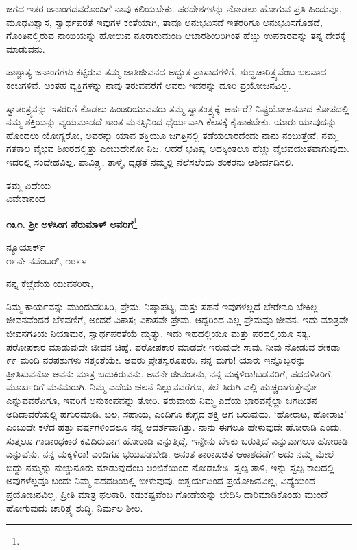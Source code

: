 ಜಗದ ಇತರ ಜನಾಂಗದವರೊಂದಿಗೆ ನಾವು ಕಲಿಯಬೇಕು. ಪರದೇಶಗಳನ್ನು ನೋಡಲು ಹೋಗುವ ಪ್ರತಿ ಹಿಂದುವೂ, ಮೂಢವಿಶ್ವಾಸ, ಸ್ವಾರ್ಥಪರತೆ ಇವುಗಳ ಕಂತೆಯಾಗಿ, ತಾವೂ ಅನುಭವಿಸದೆ ಇತರರಿಗೂ ಅನುಭವಿಸಗೊಡದೆ, ಗೊಂತಿನಲ್ಲಿರುವ ನಾಯಿಯನ್ನು ಹೋಲುವ ನೂರಾರುಮಂದಿ ಆಚಾರಶೀಲರಿಗಿಂತ ಹೆಚ್ಚು ಉಪಕಾರವನ್ನು ತನ್ನ ದೇಶಕ್ಕೆ ಮಾಡುವನು.
\vspace{0.2cm}

ಪಾಶ್ಚಾತ್ಯ ಜನಾಂಗಗಳು ಕಟ್ಟಿರುವ ತಮ್ಮ ಜಾತಿಜೀವನದ ಅದ್ಭುತ ಪ್ರಾಸಾದಗಳಿಗೆ, ಶುದ್ಧಚಾರಿತ್ರ್ಯವೆಂಬ ಬಲವಾದ ಕಂಬಗಳಿವೆ. ಅಂತಹ ವ್ಯಕ್ತಿಗಳನ್ನು ನಾವು ತರುವವರೆಗೆ ಅವರು\enginline{-} ಇವರನ್ನು ದೂರಿ ಪ್ರಯೋಜನವಿಲ್ಲ.
\vspace{0.2cm}

ಸ್ವಾತಂತ್ರ್ಯವನ್ನು ಇತರರಿಗೆ ಕೊಡಲು ಹಿಂಜರಿಯುವವರು ತಮ್ಮ \hbox{ಸ್ವಾತಂತ್ರ್ಯಕ್ಕೆ ಅರ್ಹರೆ?} ನಿಷ್ಪ್ರಯೋಜನವಾದ ಕೋಪದಲ್ಲಿ ನಮ್ಮ ಶಕ್ತಿಯನ್ನು ವ್ಯಯಮಾಡದೆ ಶಾಂತ ಮನಸ್ಸಿನಿಂದ ಧೈರ್ಯವಾಗಿ ಕೆಲಸಕ್ಕೆ ಕೈಹಾಕಬೇಕು. ಯಾರು ಯಾವುದನ್ನು ಹೊಂದಲು ಯೋಗ್ಯರೋ, ಅವರನ್ನು ಯಾವ ಶಕ್ತಿಯೂ ಜಗತ್ತಿನಲ್ಲಿ ತಡೆಯಲಾರದೆಂದು ನಾನು ನಂಬುತ್ತೇನೆ. ನಮ್ಮ ಗತಕಾಲ ವೈಭವ ಶಿಖರದಲ್ಲಿತ್ತು ಎಂಬುದೇನೋ ನಿಜ. ಆದರೆ ಭವಿಷ್ಯ ಅದಕ್ಕಿಂತಲೂ ಹೆಚ್ಚು ವೈಭವಯುತವಾಗುವುದು. ಇದರಲ್ಲಿ ಸಂದೇಹವಿಲ್ಲ. ಪಾವಿತ್ರ್ಯ, ತಾಳ್ಮೆ, ದೃಢತೆ ನಮ್ಮಲ್ಲಿ ನೆಲೆಸಲೆಂದು ಶಂಕರನು ಆಶೀರ್ವದಿಸಲಿ.

{\flushright
ತಮ್ಮ ವಿಧೇಯ\\ವಿವೇಕಾನಂದ\par}

\newpage

\begin{center}
\textbf{೧೩೧. ಶ‍್ರೀ ಅಳಸಿಂಗ ಪೆರುಮಾಳ್ ಅವರಿಗೆ}\footnote{}
\end{center}

\vspace{-0.5cm}

\begin{flushright}
ನ್ಯೂಯಾರ್ಕ್\\೧೯ನೇ ನವೆಂಬರ್, ೧೮೯೪
\end{flushright}

\vspace{-0.5cm}

\noindent
ನನ್ನ ಕೆಚ್ಚೆದೆಯ ಯುವಕರಿರಾ,

ನಿಮ್ಮ ಕಾರ್ಯವನ್ನು ಮುಂದುವರಿಸಿರಿ, ಪ್ರೇಮ, ನಿಷ್ಕಾಪಟ್ಯ, ಮತ್ತು ಸಹನೆ ಇವುಗಳಲ್ಲದೆ ಬೇರೇನೂ ಬೇಕಿಲ್ಲ. ಜೀವನವೆಂದರೆ ಬೆಳವಣಿಗೆ, ಅಂದರೆ ವಿಕಾಸ; ವಿಕಾಸವೇ ಪ್ರೇಮ. ಆದ್ದರಿಂದ ಎಲ್ಲ ಪ್ರೇಮವೂ ಜೀವನ. ಇದು ಮಾತ್ರವೇ ಜೀವನಗತಿಯ ನಿಯಾಮಕ, ಸ್ವಾರ್ಥಪರತೆಯೆ ಮೃತ್ಯು. ಇದು ಇಹದಲ್ಲಿಯೂ ಮತ್ತು ಪರದಲ್ಲಿಯೂ ಸತ್ಯ. ಪರೋಪಕಾರ ಮಾಡುವುದೇ ಜೀವನ ಚಿಹ್ನೆ. ಪರೋಪಕಾರ ಮಾಡದೇ ಇರುವುದೇ ಸಾವು. ನೀವು ನೋಡುವ ಶೇಕಡಾ ೯೯ ಮಂದಿ ನರಪಶುಗಳು ಸತ್ತಂತೆಯೇ. ಅವರು ಪ್ರೇತಸ್ವರೂಪರು. ನನ್ನ ಮಗು! ಯಾರು ಇನ್ನೊಬ್ಬರನ್ನು ಪ್ರೀತಿಸುವನೋ ಅವನು ಮಾತ್ರ ಬದುಕಿರುವನು. ಅವನೇ ಜೀವಂತನು, ನನ್ನ ಮಕ್ಕಳಿರಾ!ಬಡವರಿಗೆ, ಪದದಳಿತರಿಗೆ, ಮೂರ್ಖರಿಗೆ ಮನಮರುಗಿ. ನಿಮ್ಮ ಎದೆಯ ಚಲನೆ ನಿಲ್ಲುವವರೆಗೂ, ತಲೆ ತಿರುಗಿ ಎಲ್ಲಿ ಹುಚ್ಚರಾಗುತ್ತೇವೋ ಎನ್ನುವವರೆವಿಗೂ, ಇವರಿಗೆ ಅನುಕಂಪವನ್ನು ತೋರಿ. ತರುವಾಯ ನಿಮ್ಮ ಎದೆಯ ಭಾರವನ್ನೆಲ್ಲಾ ಜಗದೀಶನ ಅಡಿದಾವರೆಯಲ್ಲಿ ಹಗುರಮಾಡಿ. ಬಲ, ಸಹಾಯ, ಎಂದಿಗೂ ಕುಗ್ಗದ ಶಕ್ತಿ ಆಗ ಬರುವುದು. ‘ಹೋರಾಟ, ಹೋರಾಟ’ ಎಂಬುದೇ ಕಳೆದ ಹತ್ತು ವರ್ಷಗಳಿಂದಲೂ ನನ್ನ ಆದರ್ಶವಾಗಿತ್ತು. ನಾನು ಈಗಲೂ ಹೇಳುವುದೇ ಹೋರಾಡಿ ಎಂದು. ಸುತ್ತಲೂ ಗಾಡಾಂಧಕಾರ ಕವಿದಿರುವಾಗ ಹೋರಾಡಿ ಎನ್ನುತ್ತಿದ್ದೆ. ಇನ್ನೇನು ಬೆಳಕು ಬರುತ್ತಿದೆ ಎನ್ನುವಾಗಲೂ ಹೋರಾಡಿ ಎನ್ನುವೆನು. ನನ್ನ ಮಕ್ಕಳಿರಾ! ಎಂದಿಗೂ ಭಯಪಡಬೇಡಿ. ಅನಂತ ತಾರಾಖಚಿತ ಆಕಾಶದೆಡೆಗೆ ಅದು ನಮ್ಮ ಮೇಲೆ ಬಿದ್ದು ನಮ್ಮನ್ನು ನುಚ್ಚುನೂರು ಮಾಡುವುದೆಂಬ ಅಂಜಿಕೆಯಿಂದ ನೋಡಬೇಡಿ. ಸ್ವಲ್ಪ ತಾಳಿ, ಇನ್ನು ಸ್ವಲ್ಪ ಕಾಲದಲ್ಲಿ ಅವುಗಳೆಲ್ಲವೂ ಬಂದು ನಿಮ್ಮ ಪದದಡಿಯಲ್ಲಿ ಬೀಳುವುವು. ಐಶ್ವರ್ಯದಿಂದ ಪ್ರಯೋಜನವಿಲ್ಲ, ವಿದ್ಯೆಯಿಂದ ಪ್ರಯೋಜನವಿಲ್ಲ. ಪ್ರೀತಿ ಮಾತ್ರ ಫಲಕಾರಿ. ಕಡುಕಷ್ಟವೆಂಬ ಗೋಡೆಯನ್ನು ಭೇದಿಸಿ ದಾರಿಮಾಡಿಕೊಂಡು ಮುಂದೆ ಹೋಗುವುದು ಚಾರಿತ್ರ್ಯ ಶುದ್ಧಿ, ನಿರ್ಮಲ ಶೀಲ.

